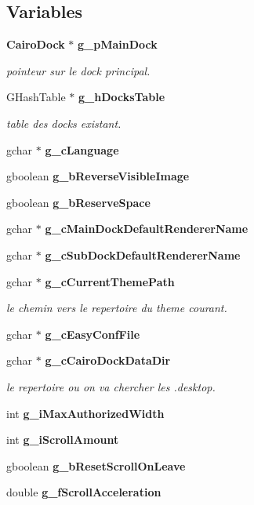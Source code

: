 \subsection*{Variables}
\begin{CompactItemize}
\item 
{\bf Cairo\-Dock} $\ast$ {\bf g\_\-p\-Main\-Dock}
\begin{CompactList}\small\item\em pointeur sur le dock principal. \item\end{CompactList}\item 
GHash\-Table $\ast$ {\bf g\_\-h\-Docks\-Table}
\begin{CompactList}\small\item\em table des docks existant. \item\end{CompactList}\item 
gchar $\ast$ {\bf g\_\-c\-Language}
\item 
gboolean {\bf g\_\-b\-Reverse\-Visible\-Image}
\item 
gboolean {\bf g\_\-b\-Reserve\-Space}
\item 
gchar $\ast$ {\bf g\_\-c\-Main\-Dock\-Default\-Renderer\-Name}
\item 
gchar $\ast$ {\bf g\_\-c\-Sub\-Dock\-Default\-Renderer\-Name}
\item 
gchar $\ast$ {\bf g\_\-c\-Current\-Theme\-Path}
\begin{CompactList}\small\item\em le chemin vers le repertoire du theme courant. \item\end{CompactList}\item 
gchar $\ast$ {\bf g\_\-c\-Easy\-Conf\-File}
\item 
gchar $\ast$ {\bf g\_\-c\-Cairo\-Dock\-Data\-Dir}
\begin{CompactList}\small\item\em le repertoire ou on va chercher les .desktop. \item\end{CompactList}\item 
int {\bf g\_\-i\-Max\-Authorized\-Width}
\item 
int {\bf g\_\-i\-Scroll\-Amount}
\item 
gboolean {\bf g\_\-b\-Reset\-Scroll\-On\-Leave}
\item 
double {\bf g\_\-f\-Scroll\-Acceleration}
\item 

\end{CompactItemize}
